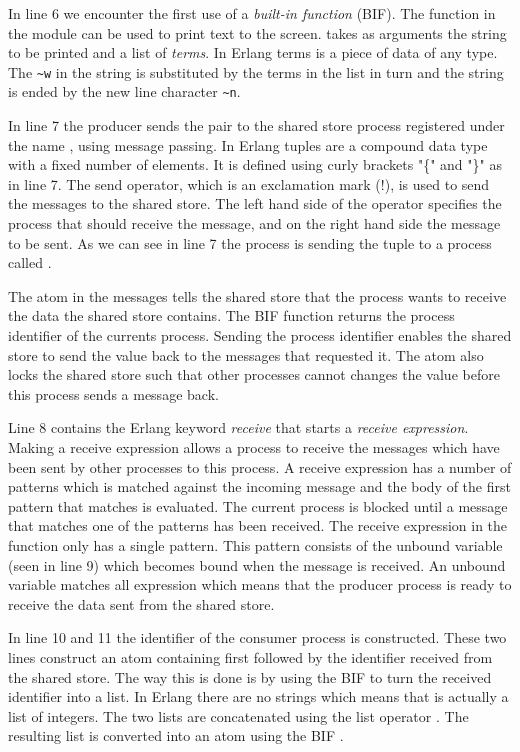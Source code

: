 In line 6 we encounter the first use of a \emph{built-in function} (BIF). The function  in the  module can be used to print text to the screen.  takes as arguments the string to be printed and a list of \emph{terms}. In Erlang terms is a piece of data of any type. The \verb|~w| in the string is substituted by the terms in the list in turn and the string is ended by the new line character \verb|~n|.

In line 7 the producer sends the pair  to the shared store process registered under the name , using message passing. In Erlang tuples are a compound data type with a fixed number of elements. It is defined using curly brackets "\{" and "\}" as in line 7. The send operator, which is an exclamation mark (!), is used to send the messages to the shared store. The left hand side of the operator specifies the process that should receive the message, and on the right hand side the message to be sent. As we can see in line 7 the  process is sending the tuple to a process called .

The atom  in the messages tells the shared store that the process wants to receive the data the shared store contains. The BIF function  returns the process identifier of the currents process. Sending the process identifier enables the shared store to send the value back to the messages that requested it. The atom  also locks the shared store such that other processes cannot changes the value before this process sends a  message back.

Line 8 contains the Erlang keyword \emph{receive} that starts a \emph{receive expression}. Making a receive expression allows a process to receive the messages which have been sent by other processes to this process. A receive expression has a number of patterns which is matched against the incoming message and the body of the first pattern that matches is evaluated. The current process is blocked until a message that matches one of the patterns has been received. The receive expression in the  function only has a single pattern. This pattern consists of the unbound variable  (seen in line 9) which becomes bound when the message is received. An unbound variable matches all expression which means that the producer process is ready to receive the data sent from the shared store.

In line 10 and 11 the identifier of the consumer process is constructed. These two lines construct an atom containing first  followed by the identifier received from the shared store. The way this is done is by using the BIF  to turn the received identifier into a list. In Erlang there are no strings which means that  is actually a list of integers. The two lists are concatenated using the list operator \code{++}. The resulting list is converted into an atom using the BIF .

